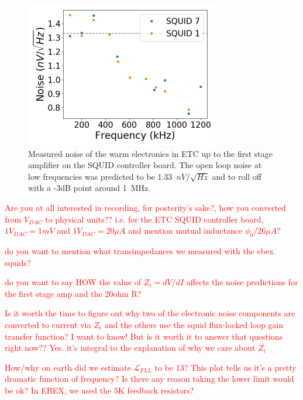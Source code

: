 \begin{figure}[ht!]
\begin{center}
\includegraphics[height=2.5in]{figures/warm_electronic_noise.png}
\caption{Measured noise of the warm electronics in \ac{ETC} up to the first stage amplifier on the \ac{SQUID} controller board. The open loop noise at low frequencies was predicted to be 1.33~$nV/\sqrt{Hz}$ and to roll off with a -3dB point around 1~MHz. 
\label{fig:dark_electronic_noise} }
\end{center}
\end{figure}


\textcolor{red}{Are you at all interested in recording, for posterity's sake?, how you converted from $V_{DAC}$ to physical units?? i.e. for the \ac{ETC} \ac{SQUID} controller board, $1 V_{DAC} = 1 mV$ and $1 V_{DAC} = 20 \mu A$ and mention mutual inductance $\phi_{0}/26 \mu A$?}

\textcolor{red}{do you want to mention what transimpedances we measured with the ebex squids?}

\textcolor{red}{ do you want to say HOW the value of $Z_{t} = dV/dI$ affects the noise predictions for the first stage amp and the 20ohm R?}

\textcolor{red}{Is it worth the time to figure out why two of the electronic noise components are converted to current via $Z_{t}$ and the others use the squid flux-locked loop gain transfer function? I want to know! But is it worth it to answer that questions right now?? Yes. it's integral to the explanation of why we care about $Z_{t}$}

\textcolor{red}{How/why on earth did we estimate $\mathscr{L}_{FLL}$ to be 13? This plot tells us it's a pretty dramatic function of frequency? Is there any reason taking the lower limit would be ok? In EBEX, we used the 5K feedback resistors?}

